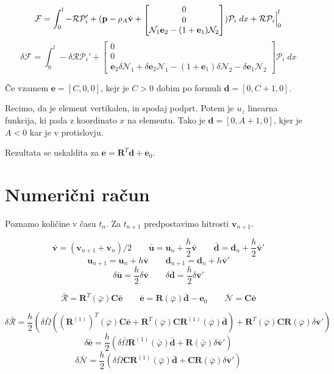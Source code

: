 \documentclass{article}
\newcommand{\dep}[1]{{\scriptstyle(#1)}}
\begin{document}
$$\mathcal{F} = \int_0^l-\mathcal{R}\mathcal{P}_i' + (\mathbf{p}-\rho_A \dot{\mathbf{v}} + {\scriptscriptstyle \begin{bmatrix} 0\\ 0\\ \mathcal{N}_1\mathbf{e}_2 - (1+\mathbf{e}_1) \mathcal{N}_2 \end{bmatrix}}) \mathcal{P}_i \; dx + \mathcal{R}\mathcal{P}_i\Bigl |_0^l$$
	$$\delta \mathcal{F} = \int_0^l- \delta \mathcal{RP}_i' + {\scriptscriptstyle \begin{bmatrix} 0\\ 0\\ \mathbf{e}_2\delta\mathcal{N}_1+\delta \mathbf{e}_2 \mathcal{N}_1-(1+\mathbf{e}_1)\delta \mathcal{N}_2 - \delta \mathbf{e}_1 \mathcal{N}_2 \end{bmatrix}}\mathcal{P}_i\; dx$$

Če vzamem $\mathbf{e} = [C,0,0]$, kejr je $C>0$ dobim po formuli $\mathbf{d} = [0,C+1,0]$.

Recimo, da je element vertikalen, in spodaj podprt. Potem je $u_z$ linearna funkcija, ki pada z koordinato $x$ na elementu. Tako je $\mathbf{d} = [0,A+1,0]$, kjer je $A<0$ kar je v protislovju.

Rezultata se uskaldita za $\mathbf{e} = \mathbf{R}^T\mathbf{d}+\mathbf{e}_0$.





\newpage
\section{Numerični račun}
Poznamo količine v času $t_n$. Za $t_{n+1}$ predpostavimo hitrosti $\mathbf{v}_{n+1}$.

$$\bar{\mathbf{v}} = (\mathbf{v}_{n+1} + \mathbf{v}_{n})/2 \qquad \bar{\mathbf{u}} = \mathbf{u}_{n} + \frac{h}{2}\bar{\mathbf{v}} \qquad \bar{\mathbf{d}} = \mathbf{d}_n + \frac{h}{2}\bar{\mathbf{v}}' $$
$$\mathbf{u}_{n+1} = \mathbf{u}_n+h\bar{\mathbf{v}} \qquad \mathbf{d}_{n+1} = \mathbf{d}_n+h\bar{\mathbf{v}}'$$ 
$$ \delta\bar{\mathbf{u}} = \frac{h}{2}\delta\bar{\mathbf{v}} \qquad  \delta\bar{\mathbf{d}} = \frac{h}{2}\delta\bar{\mathbf{v}}'$$ 

$$\bar{\mathcal{R}} = \mathbf{R}^T\dep{\bar{\varphi}}\mathbf{C}\bar{\mathbf{e}}  \qquad \bar{\mathbf{e}} = \mathbf{R}\dep{\bar{\varphi}}\bar{\mathbf{d}}-\mathbf{e}_0 \qquad \bar{\mathcal{N}} = \mathbf{C}\bar{\mathbf{e}}  $$

$$\delta \bar{\mathcal{R}} = \frac{h}{2} (\delta\bar{\Omega}((\mathbf{R}^{(1)})^T\dep{\bar{\varphi}}\mathbf{C}\bar{\mathbf{e}} + \mathbf{R}^T\dep{\bar{\varphi}}\mathbf{CR}^{(1)}\dep{\bar{\varphi}}\bar{\mathbf{d}}) + \mathbf{R}^T\dep{\bar{\varphi}} \mathbf{CR}\dep{\bar{\varphi}}\delta\bar{\mathbf{v}}' )$$
$$\delta\bar{\mathbf{e}} = \frac{h}{2}(\delta\bar{\Omega}\mathbf{R}^{(1)}\dep{\bar{\varphi}}\bar{\mathbf{d}} + \mathbf{R}\dep{\bar{\varphi}}\delta\bar{\mathbf{v}}')$$
$$\delta\bar{\mathcal{N}} = \frac{h}{2} (\delta\bar{\Omega}\mathbf{CR}^{(1)}\dep{\bar{\varphi}}\bar{\mathbf{d}} + \mathbf{CR}\dep{\bar{\varphi}}\delta\bar{\mathbf{v}}')$$
\end{document}
